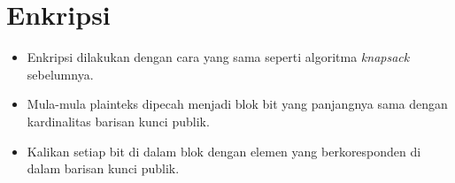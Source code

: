 \documentclass{article}
\begin{document}

\section*{Enkripsi}

\begin{itemize}
    \item Enkripsi dilakukan dengan cara yang sama seperti algoritma \textit{knapsack} sebelumnya.
    \item Mula-mula plainteks dipecah menjadi blok bit yang panjangnya sama dengan kardinalitas barisan kunci publik.
    \item Kalikan setiap bit di dalam blok dengan elemen yang berkoresponden di dalam barisan kunci publik.
\end{itemize}
\end{document}
